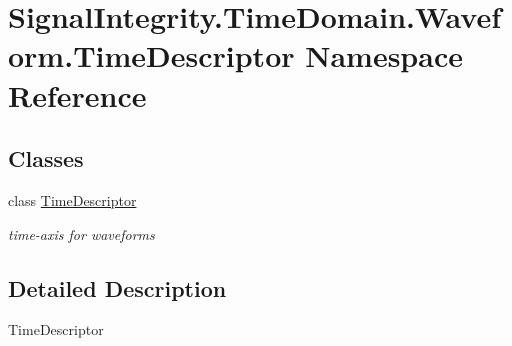 \hypertarget{namespaceSignalIntegrity_1_1TimeDomain_1_1Waveform_1_1TimeDescriptor}{}\section{Signal\+Integrity.\+Time\+Domain.\+Waveform.\+Time\+Descriptor Namespace Reference}
\label{namespaceSignalIntegrity_1_1TimeDomain_1_1Waveform_1_1TimeDescriptor}
\subsection*{Classes}
\begin{DoxyCompactItemize}
\item 
class \hyperlink{classSignalIntegrity_1_1TimeDomain_1_1Waveform_1_1TimeDescriptor_1_1TimeDescriptor}{Time\+Descriptor}
\begin{DoxyCompactList}\small\item\em time-\/axis for waveforms \end{DoxyCompactList}\end{DoxyCompactItemize}


\subsection{Detailed Description}
\begin{DoxyVerb}TimeDescriptor\end{DoxyVerb}
 